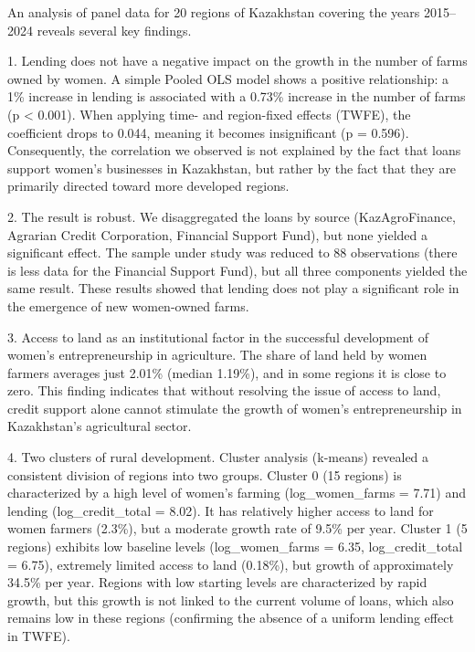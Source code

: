 An analysis of panel data for 20 regions of Kazakhstan covering the
years 2015--2024 reveals several key findings.

1. Lending does not have a negative impact on the growth in the number
of farms owned by women. A simple Pooled OLS model shows a positive
relationship: a 1\% increase in lending is associated with a 0.73\%
increase in the number of farms (p \textless{} 0.001). When applying
time- and region-fixed effects (TWFE), the coefficient drops to 0.044,
meaning it becomes insignificant (p = 0.596). Consequently, the
correlation we observed is not explained by the fact that loans support
women's businesses in Kazakhstan, but rather by the fact that they are
primarily directed toward more developed regions.

2. The result is robust. We disaggregated the loans by source
(KazAgroFinance, Agrarian Credit Corporation, Financial Support Fund),
but none yielded a significant effect. The sample under study was
reduced to 88 observations (there is less data for the Financial Support
Fund), but all three components yielded the same result. These results
showed that lending does not play a significant role in the emergence of
new women-owned farms.

3. Access to land as an institutional factor in the successful
development of women's entrepreneurship in agriculture. The share of
land held by women farmers averages just 2.01\% (median 1.19\%), and in
some regions it is close to zero. This finding indicates that without
resolving the issue of access to land, credit support alone cannot
stimulate the growth of women's entrepreneurship in Kazakhstan's
agricultural sector.

4. Two clusters of rural development. Cluster analysis (k-means)
revealed a consistent division of regions into two groups. Cluster 0 (15
regions) is characterized by a high level of women's farming
(log\_women\_farms = 7.71) and lending (log\_credit\_total = 8.02). It
has relatively higher access to land for women farmers (2.3\%), but a
moderate growth rate of 9.5\% per year. Cluster 1 (5 regions) exhibits
low baseline levels (log\_women\_farms = 6.35, log\_credit\_total =
6.75), extremely limited access to land (0.18\%), but growth of
approximately 34.5\% per year. Regions with low starting levels are
characterized by rapid growth, but this growth is not linked to the
current volume of loans, which also remains low in these regions
(confirming the absence of a uniform lending effect in TWFE).

